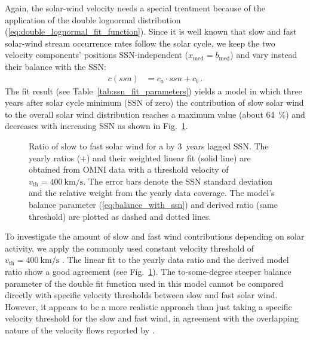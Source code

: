 \documentclass[]{aa}
\begin{document}
        Again, the solar-wind velocity needs a special treatment because of the application of the double lognormal distribution (\ref{eq:double_lognormal_fit_function}). Since it is well known that slow and fast solar-wind stream occurrence rates follow the solar cycle, we keep the two velocity components' positions SSN-independent ($x_\text{med} =  b_\text{med}$) and vary instead their balance with the SSN:
        \begin{align}
                c(ssn) &= c_a \cdot ssn + c_b\,.        \label{eq:balance_with_ssn}
        \end{align}
        The fit result (see Table~\ref{tab:ssn_fit_parameters}) yields a model in which three years after solar cycle minimum (SSN of zero) the contribution of slow solar wind to the overall solar wind distribution reaches a maximum value (about \SI{64}{\percent}) and decreases with increasing SSN as shown in Fig.~\ref{fig:Vdbl_SSN_ratio_f_plot}.
        \begin{figure}
                \caption{Ratio of slow to fast solar wind for a by 3~years lagged SSN. The yearly ratios (+) and their weighted linear fit (solid line) are obtained from OMNI data with a threshold velocity of $v_\text{th} = \SI{400}{\km\per\s}$. The error bars denote the SSN standard deviation and the relative weight from the yearly data coverage. The model's balance parameter (\ref{eq:balance_with_ssn}) and derived ratio (same threshold) are plotted as dashed and dotted lines.}
                \label{fig:Vdbl_SSN_ratio_f_plot}
        \end{figure}

        To investigate the amount of slow and fast wind contributions depending on solar activity, we apply the commonly used constant velocity threshold of $v_\text{th} = \SI{400}{\km\per\s}$ \citep[p.~144]{Schwenn1990}. The linear fit to the yearly data ratio and the derived model ratio show a good agreement (see Fig.~\ref{fig:Vdbl_SSN_ratio_f_plot}). The to-some-degree steeper balance parameter of the double fit function used in this model cannot be compared directly with specific velocity thresholds between slow and fast solar wind. However, it appears to be a more realistic approach than just taking a specific velocity threshold for the slow and fast wind, in agreement with the overlapping nature of the velocity flows reported by \citet{McGregor2011b}.
\end{document}
